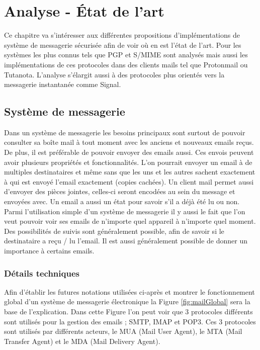 \chapter{Analyse - État de l'art}
\label{ch:analysis}
Ce chapitre va s'intéresser aux différentes propositions d'implémentations de système de messagerie sécurisée afin de voir où en est l'état de l'art. Pour les systèmes les plus connus tels que PGP et S/MIME sont analysés mais aussi les implémentations de ces protocoles dans des clients mails tel que Protonmail ou Tutanota. L'analyse s'élargit aussi à des protocoles plus orientés vers la messagerie instantanée comme Signal.

\section{Système de messagerie}
Dans un système de messagerie les besoins principaux sont surtout de pouvoir consulter sa boîte mail à tout moment avec les anciens et nouveaux emails reçus. De plus, il est préférable de pouvoir envoyer des emails aussi. Ces envois peuvent avoir plusieurs propriétés et fonctionnalités. L'on pourrait envoyer un email à de multiples destinataires et même sans que les uns et les autres sachent exactement à qui est envoyé l'email exactement (copies cachées). Un client mail permet aussi d'envoyer des pièces jointes, celles-ci seront encodées au sein du message et envoyées avec. Un email a aussi un état pour savoir s'il a déjà été lu ou non. Parmi l'utilisation simple d'un système de messagerie il y aussi le fait que l'on veut pouvoir voir ses emails de n'importe quel appareil à n'importe quel moment. Des possibilités de suivis sont généralement possible, afin de savoir si le destinataire a reçu / lu l'email. Il est aussi généralement possible de donner un importance à certains emails.

\subsection{Détails techniques}
Afin d'établir les futures notations utilisées ci-après et montrer le fonctionnement global d'un système de messagerie électronique la Figure \ref{fig:mailGlobal} sera la base de l'explication. Dans cette Figure l'on peut voir que 3 protocoles différents sont utilisés pour la gestion des emails ; SMTP, IMAP et POP3. Ces 3 protocoles sont utilisés par différents acteurs, le MUA (Mail User Agent), le MTA (Mail Transfer Agent) et le MDA (Mail Delivery Agent).

